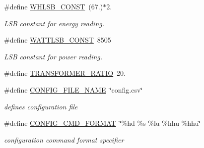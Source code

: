 \begin{DoxyCompactItemize}
\#define \hyperlink{a00037_a75a052821a52067f93124e0c7ddcfdc3}{W\-H\-L\-S\-B\-\_\-\-C\-O\-N\-S\-T}~(67.)$\ast$2.
\begin{DoxyCompactList}\small\item\em L\-S\-B constant for energy reading. \end{DoxyCompactList}\item 
\#define \hyperlink{a00037_a218dca2818f6fa6923467998b967a084}{W\-A\-T\-T\-L\-S\-B\-\_\-\-C\-O\-N\-S\-T}~8505
\begin{DoxyCompactList}\small\item\em L\-S\-B constant for power reading. \end{DoxyCompactList}\item 
\#define \hyperlink{a00037_abcedc82a86b3c2ac9850cb7c6f5e7a9b}{T\-R\-A\-N\-S\-F\-O\-R\-M\-E\-R\-\_\-\-R\-A\-T\-I\-O}~20.
\item 
\#define \hyperlink{a00037_a62921b92fa4fb37f1e3a5d4c644fc1d8}{C\-O\-N\-F\-I\-G\-\_\-\-F\-I\-L\-E\-\_\-\-N\-A\-M\-E}~\char`\"{}config.\-csv\char`\"{}
\begin{DoxyCompactList}\small\item\em defines configuration file \end{DoxyCompactList}\item 
\#define \hyperlink{a00037_a4891d4b97842b3419b2252198ace033f}{C\-O\-N\-F\-I\-G\-\_\-\-C\-M\-D\-\_\-\-F\-O\-R\-M\-A\-T}~\char`\"{}\%hd \%s \%lu \%hhu \%hhu\char`\"{}
\begin{DoxyCompactList}\small\item\em configuration command format specifier \end{DoxyCompactList}\end{DoxyCompactItemize}
